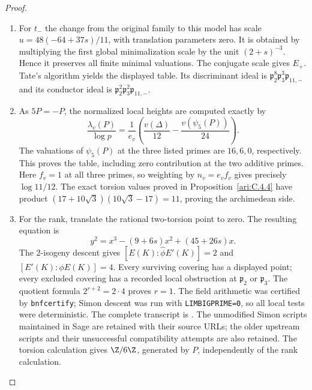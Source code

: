 \begin{proof}
\begin{enumerate}[label=\arabic*.,leftmargin=*]
\item For $t_-$ the change from the original family to this model
has scale $u=48(-64+37s)/11$, with translation parameters zero.
It is obtained by multiplying the first global minimalization
scale by the unit $(2+s)^{-3}$. Hence it preserves all finite
minimal valuations. The conjugate scale gives $E_+$.
Tate's algorithm yields the displayed table. Its discriminant
ideal is
$\mathfrak p_2^8\mathfrak p_3^3\mathfrak p_{11,-}$ and its
conductor ideal is
$\mathfrak p_2^2\mathfrak p_3^2\mathfrak p_{11,-}$.

\item As $5P=-P$, the normalized local heights are computed exactly by
\[
 \frac{\lambda_v(P)}{\log p}
 =\frac1{e_v}\left(\frac{v(\Delta)}{12}
                         -\frac{v(\psi_5(P))}{24}\right).
\]
The valuations of $\psi_5(P)$ at the three listed primes are
$16,6,0$, respectively. This proves the table, including zero
contribution at the two additive primes. Here $f_v=1$ at all
three primes, so weighting by $n_v=e_vf_v$ gives precisely
$\log11/12$. The exact torsion values proved in Proposition~\ref{ari:C.4.4} have product
$(17+10\sqrt3)(10\sqrt3-17)=11$, proving the archimedean side.

\item For the rank, translate the rational two-torsion point to zero.
The resulting equation is
\[
 y^2=x^3-(9+6s)x^2+(45+26s)x.
\]
The $2$-isogeny descent gives
$[E(K):\widehat\phi E'(K)]=2$ and
$[E'(K):\phi E(K)]=4$. Every surviving covering has a
displayed point; every excluded covering has a recorded local
obstruction at $\mathfrak p_2$ or $\mathfrak p_3$.
The quotient formula $2^{r+2}=2\cdot4$ proves $r=1$.
The field arithmetic was certified by \texttt{bnfcertify};
Simon descent was run with \texttt{LIMBIGPRIME=0}, so all local
tests were deterministic. The complete transcript is
. The unmodified
Simon scripts maintained in Sage are retained with their source
URLs; the older upstream scripts and their unsuccessful
compatibility attempts are also retained. The torsion calculation
gives $\Z/6\Z$, generated by $P$, independently of the rank
calculation.
\end{enumerate}
\end{proof}

